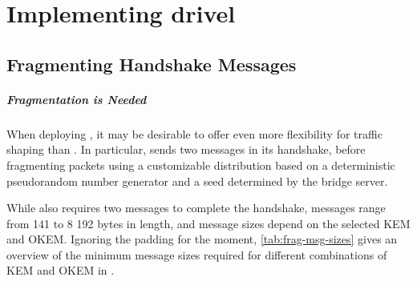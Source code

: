\chapter{Implementing drivel}\label{ch:implementation}


\section{Fragmenting Handshake Messages} \label{sec:fragmentation}

\paragraph{Fragmentation is Needed}
When deploying \drivel{}, it may be desirable to offer even more flexibility for traffic shaping than \obfsfour{}. In particular, \obfsfour{} sends two messages in its handshake, before fragmenting packets using a customizable distribution based on a deterministic pseudorandom number generator and a seed determined by the bridge server.

While \drivel{} also requires two messages to complete the handshake, \obfsfour{} messages range from 141 to 8 192 bytes in length, and \drivel{} message sizes depend on the selected KEM and OKEM. Ignoring the padding for the moment, \cref{tab:frag-msg-sizes} gives an overview of the minimum message sizes required for different combinations of KEM and OKEM in \drivel{}.

